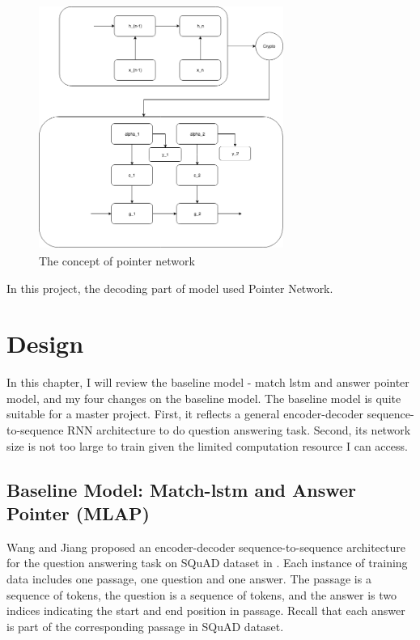 \documentclass[modernstyle,12pt]{sjsuthesis}
\theoremstyle{definition}
\begin{document}
\begin{figure}[htbp]\centering
  \includegraphics[width=8cm, height=8cm]{figures/pointerNetwork.png}
  \caption{The concept of pointer network}
  \label{f:pointerNetwork}
\end{figure}

In this project, the decoding part of model used Pointer Network.


\chapter{Design}\label{chap:design}

In this chapter, I will review the baseline model - match lstm and answer pointer model, and my four changes on the baseline model. The baseline model is quite suitable for a master project. First, it reflects a general encoder-decoder sequence-to-sequence RNN architecture to do question answering task. Second, its network size is not too large to train given the limited computation resource I can access.


\section{Baseline Model: Match-lstm and Answer Pointer (MLAP) }

Wang and Jiang  proposed an encoder-decoder sequence-to-sequence architecture for the question answering task on SQuAD dataset in \cite{wang2016machine}. Each instance of training data includes one passage, one question and one answer. The passage is a sequence of tokens, the question is a sequence of tokens, and the answer is two indices indicating the start and end position in passage. Recall that each answer is part of the corresponding passage in SQuAD dataset.
\end{document}
